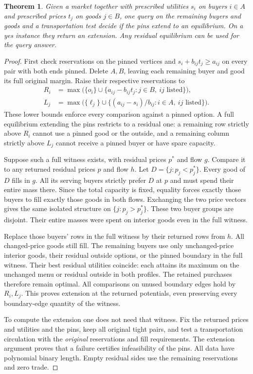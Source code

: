\documentclass[11pt,oneside,openany,notitlepage]{report}
\newtheorem{theorem}{Theorem}[chapter]
\begin{document}
\begin{theorem}\label{thm:pins}
Given a market together with prescribed utilities \(s_i\) on buyers
\(i\in A\) and prescribed prices \(t_j\) on goods \(j\in B\), one query
on the remaining buyers and goods and a transportation test decide if the
pins extend to an equilibrium. On a yes instance they return an extension.
Any residual equilibrium can be used for the query answer.
\end{theorem}
\begin{proof}
First check reservations on the pinned vertices and
\(s_i+b_{ij}t_j\ge a_{ij}\) on every pair with both ends pinned.
Delete \(A,B\), leaving each remaining buyer and good its full original
margin. Raise their respective reservations to
\begin{align*}
 R_i&=\max\bigl(\{o_i\}\cup\{a_{ij}-b_{ij}t_j:j\in B,\ ij\text{ listed}\}\bigr),\\
 L_j&=\max\bigl(\{\ell_j\}\cup
           \{(a_{ij}-s_i)/b_{ij}:i\in A,\ ij\text{ listed}\}\bigr).
\end{align*}
These lower bounds enforce every comparison against a pinned option.
A full equilibrium extending the pins restricts to a residual one: a
remaining row strictly above \(R_i\) cannot use a pinned good or the
outside, and a remaining column strictly above \(L_j\) cannot receive
a pinned buyer or have spare capacity.

Suppose such a full witness exists, with residual prices \(p^*\) and
flow \(g\). Compare it to any returned residual prices \(p\) and flow
\(h\). Let \(D=\{j:p_j<p_j^*\}\). Every good of \(D\) fills in \(g\).
All its serving buyers strictly prefer \(D\) at \(p\) and must spend
their entire mass there. Since the total capacity is fixed, equality
forces exactly those buyers to fill exactly those goods in both flows.
Exchanging the two price vectors gives the same isolated structure on
\(\{j:p_j>p_j^*\}\). These two buyer groups are disjoint. Their entire
masses were spent on interior goods even in the full witness.

Replace those buyers' rows in the full witness by their returned rows
from \(h\). All changed-price goods still fill. The remaining buyers
use only unchanged-price interior goods, their residual outside
options, or the pinned boundary in the full witness. Their best
residual utilities coincide: each attains its maximum on the unchanged
menu or residual outside in both profiles. The retained purchases
therefore remain optimal. All comparisons on unused boundary edges
hold by \(R_i,L_j\). This proves extension at the returned potentials,
even preserving every boundary-edge quantity of the witness.

To compute the extension one does not need that witness. Fix the
returned prices and utilities and the pins, keep all original tight
pairs, and test a transportation circulation with the \emph{original}
reservations and fill requirements. The extension argument proves that
a failure certifies infeasibility of the pins. All data have polynomial
binary length. Empty residual sides use the remaining reservations and
zero trade.
\end{proof}
\end{document}
